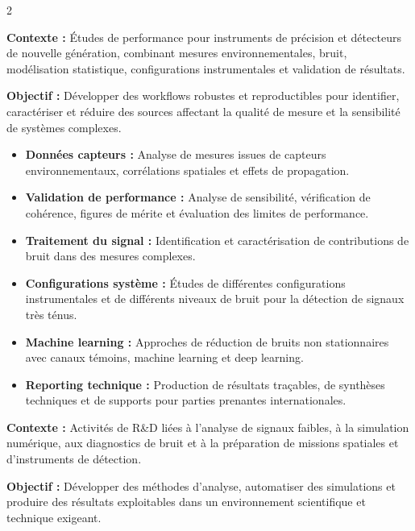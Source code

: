\documentclass[8pt,a4paper,ragged2e,withhyper]{altacv}
\begin{document}
\begin{paracol}{2}
\divider


\textbf{Contexte :} Études de performance pour instruments de précision et détecteurs de nouvelle génération, combinant mesures environnementales, bruit, modélisation statistique, configurations instrumentales et validation de résultats.

\textbf{Objectif :} Développer des workflows robustes et reproductibles pour identifier, caractériser et réduire des sources affectant la qualité de mesure et la sensibilité de systèmes complexes.

\begin{itemize}
  \item \textbf{Données capteurs :} Analyse de mesures issues de capteurs environnementaux, corrélations spatiales et effets de propagation.
  \item \textbf{Validation de performance :} Analyse de sensibilité, vérification de cohérence, figures de mérite et évaluation des limites de performance.
  \item \textbf{Traitement du signal :} Identification et caractérisation de contributions de bruit dans des mesures complexes.
  \item \textbf{Configurations système :} Études de différentes configurations instrumentales et de différents niveaux de bruit pour la détection de signaux très ténus.
  \item \textbf{Machine learning :} Approches de réduction de bruits non stationnaires avec canaux témoins, machine learning et deep learning.
  \item \textbf{Reporting technique :} Production de résultats traçables, de synthèses techniques et de supports pour parties prenantes internationales.
\end{itemize}

\divider


\textbf{Contexte :} Activités de R\&D liées à l’analyse de signaux faibles, à la simulation numérique, aux diagnostics de bruit et à la préparation de missions spatiales et d’instruments de détection.

\textbf{Objectif :} Développer des méthodes d’analyse, automatiser des simulations et produire des résultats exploitables dans un environnement scientifique et technique exigeant.


\end{paracol}
\end{document}
